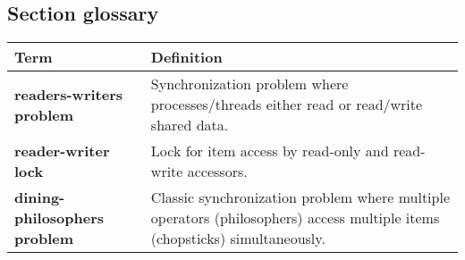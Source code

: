 \subsection{Section glossary}
\centering
\begin{tabular}{>{\raggedright}p{} >{\raggedright\arraybackslash}p{}}
\toprule
\textbf{Term} & \textbf{Definition} \\
\midrule
\textbf{readers-writers problem} & Synchronization problem where processes/threads either read or read/write shared data. \\
\textbf{reader-writer lock} & Lock for item access by read-only and read-write accessors. \\
\textbf{dining-philosophers problem} & Classic synchronization problem where multiple operators (philosophers) access multiple items (chopsticks) simultaneously. \\
\bottomrule
\end{tabular}
\vspace{\baselineskip}
